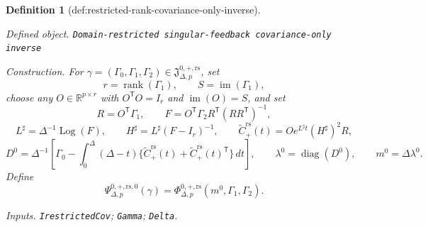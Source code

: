 \documentclass{article}
\newtheorem{definition}{Definition}
\begin{document}
\begin{definition}[def:restricted-rank-covariance-only-inverse]\label{def:restricted-rank-covariance-only-inverse}
\par\smallskip\noindent\emph{Defined object.} \texttt{Domain-\allowbreak{}restricted singular-\allowbreak{}feedback covariance-\allowbreak{}only inverse}
\par\smallskip\noindent\emph{Construction.} For \(\gamma=(\Gamma_0,\Gamma_1,\Gamma_2)\in
\mathfrak J_{\Delta,p}^{0,+,\mathrm{rs}}\), set
\[
 r=\operatorname{rank}(\Gamma_1),\qquad S=\operatorname{im}(\Gamma_1),
\]
choose any \(O\in\mathbb R^{p\times r}\) with \(O^{\mathsf T}O=I_r\) and \(\operatorname{im}(O)=S\), and set
\[
 R=O^{\mathsf T}\Gamma_1,\qquad
 F=O^{\mathsf T}\Gamma_2R^{\mathsf T}(RR^{\mathsf T})^{-1},
\]
\[
 L^\sharp=\Delta^{-1}\operatorname{Log}(F),\qquad
 H^\sharp=L^\sharp(F-I_r)^{-1},\qquad
 \widetilde C_{+}^{\mathrm{rs}}(t)
 =Oe^{L^\sharp t}(H^\sharp)^2R,
\]
\[
 D^0=\Delta^{-1}\!\left[
 \Gamma_0-\int_0^\Delta(\Delta-t)
 \{\widetilde C_{+}^{\mathrm{rs}}(t)
  +\widetilde C_{+}^{\mathrm{rs}}(t)^{\mathsf T}\}\,dt\right],
 \qquad \lambda^0=\operatorname{diag}(D^0),
 \qquad m^0=\Delta\lambda^0.
\]
Define
\[
 \Psi_{\Delta,p}^{0,+,\mathrm{rs},0}(\gamma)
 =\Phi_{\Delta,p}^{0,+,\mathrm{rs}}(m^0,\Gamma_1,\Gamma_2).
\]
\par\smallskip\noindent\emph{Inputs.} \texttt{IrestrictedCov}; \texttt{Gamma}; \texttt{Delta}.
\end{definition}
\end{document}
